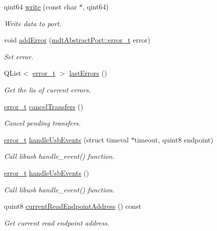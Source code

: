 \begin{DoxyCompactItemize}
qint64 \hyperlink{classmdt_usb_port_ae777e33325ff2adef326dd7f81b00838}{write} (const char $\ast$, qint64)
\begin{DoxyCompactList}\small\item\em Write data to port. \end{DoxyCompactList}\item 
void \hyperlink{classmdt_usb_port_aa857e94b4167c53b26573042ee3af280}{addError} (\hyperlink{classmdt_abstract_port_ad4121bb930c95887e77f8bafa065a85e}{mdtAbstractPort::error\_\-t} error)
\begin{DoxyCompactList}\small\item\em Set error. \end{DoxyCompactList}\item 
QList$<$ \hyperlink{classmdt_abstract_port_ad4121bb930c95887e77f8bafa065a85e}{error\_\-t} $>$ \hyperlink{classmdt_usb_port_a81855cebd9b672a74d836955236c19bf}{lastErrors} ()
\begin{DoxyCompactList}\small\item\em Get the lis of current errors. \end{DoxyCompactList}\item 
\hyperlink{classmdt_abstract_port_ad4121bb930c95887e77f8bafa065a85e}{error\_\-t} \hyperlink{classmdt_usb_port_afe5b473e1df8b828c17f83a45a3902fb}{cancelTransfers} ()
\begin{DoxyCompactList}\small\item\em Cancel pending transfers. \end{DoxyCompactList}\item 
\hyperlink{classmdt_abstract_port_ad4121bb930c95887e77f8bafa065a85e}{error\_\-t} \hyperlink{classmdt_usb_port_a551748422808cbb071930e1134bfaad5}{handleUsbEvents} (struct timeval $\ast$timeout, quint8 endpoint)
\begin{DoxyCompactList}\small\item\em Call libusb handle\_\-event() function. \end{DoxyCompactList}\item 
\hyperlink{classmdt_abstract_port_ad4121bb930c95887e77f8bafa065a85e}{error\_\-t} \hyperlink{classmdt_usb_port_abb66e85fc1366112eeb0a6e86f6e7e32}{handleUsbEvents} ()
\begin{DoxyCompactList}\small\item\em Call libusb handle\_\-event() function. \end{DoxyCompactList}\item 
quint8 \hyperlink{classmdt_usb_port_a860e89069ba433e6174c032a28d0eae2}{currentReadEndpointAddress} () const 
\begin{DoxyCompactList}\small\item\em Get current read endpoint address. \end{DoxyCompactList}\end{DoxyCompactItemize}
